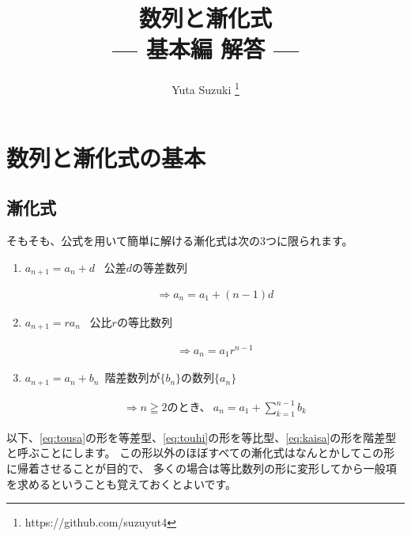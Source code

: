 \documentclass[a4paper]{ltjsarticle}
\title{
  {\Large 数列と漸化式} \\
  --- 基本編 解答 ---
}
\author{
  Yuta Suzuki
  \thanks{https://github.com/suzuyut4}
}
\date{}
\begin{document}
\maketitle

\section{数列と漸化式の基本}

\subsection{漸化式}

そもそも、公式を用いて簡単に解ける漸化式は次の3つに限られます。

\begin{enumerate}[label=(\roman*)]
  \item
  $a_{n+1} = a_n + d$  \rightarrow\, 公差$d$の等差数列
  \begin{fleqn}[20pt]
    \begin{align}
      \Rightarrow a_n = a_1 + (n-1)d \label{eq:tousa}
    \end{align}
  \end{fleqn}
  \item
  $a_{n+1} = ra_n$     \rightarrow\, 公比$r$の等比数列
  \begin{fleqn}[20pt]
    \begin{align}
      \Rightarrow a_n = a_1 r^{n-1} \label{eq:touhi}
    \end{align}
  \end{fleqn}
  \item
  $a_{n+1} = a_n + b_n$\rightarrow\, 階差数列が$\{b_n\}$の数列$\{a_n\}$
  \begin{fleqn}[20pt]
    \begin{align}
      \Rightarrow n\geqq 2 \text{のとき、}\:a_n = a_1 + \sum_{k=1}^{n-1}b_k \label{eq:kaisa}
    \end{align}
  \end{fleqn}
\end{enumerate}
以下、\eqref{eq:tousa}の形を等差型、\eqref{eq:touhi}の形を等比型、\eqref{eq:kaisa}の形を階差型
と呼ぶことにします。
この形以外のほぼすべての漸化式はなんとかしてこの形に帰着させることが目的で、
多くの場合は等比数列の形に変形してから一般項を求めるということも覚えておくとよいです。
\end{document}
